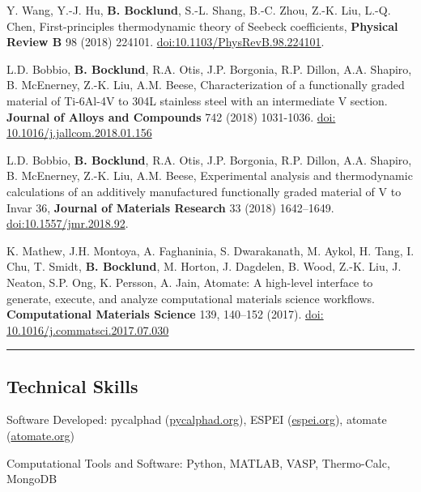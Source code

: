 \documentclass[10pt,letterpaper]{article}
\newenvironment{indentsection}[1]%
{\begin{list}{}%
  {\setlength{\leftmargin}{#1}}%
  \item[]%
}
{\end{list}}
\begin{document}
\begin{itemize*}
\item Y. Wang, Y.-J. Hu, \textbf{B. Bocklund}, S.-L. Shang, B.-C. Zhou, Z.-K. Liu, L.-Q. Chen,
  First-principles thermodynamic theory of Seebeck coefficients,
  \textbf{Physical Review B} 98 (2018) 224101.
  \href{https://doi.org/10.1103/PhysRevB.98.224101}{doi:10.1103/PhysRevB.98.224101}.

\item L.D. Bobbio, \textbf{B. Bocklund}, R.A. Otis, J.P. Borgonia, R.P. Dillon, A.A. Shapiro, B. McEnerney, Z.-K. Liu, A.M. Beese,
  Characterization of a functionally graded material of Ti-6Al-4V to 304L stainless steel with an intermediate V section. \textbf{Journal of Alloys and Compounds} 742 (2018) 1031-1036.
  \href{https://doi.org/10.1016/j.jallcom.2018.01.156}{doi: 10.1016/j.jallcom.2018.01.156}

\item L.D. Bobbio, \textbf{B. Bocklund}, R.A. Otis, J.P. Borgonia, R.P. Dillon, A.A. Shapiro, B. McEnerney, Z.-K. Liu, A.M. Beese,
  Experimental analysis and thermodynamic calculations of an additively manufactured functionally graded material of V to Invar 36,
  \textbf{Journal of Materials Research} 33 (2018) 1642–1649.
  \href{https://doi.org/10.1016/10.1557/jmr.2018.92}{doi:10.1557/jmr.2018.92}.

\item K. Mathew, J.H. Montoya, A. Faghaninia, S. Dwarakanath, M. Aykol,
  H. Tang, I. Chu, T. Smidt, \textbf{B. Bocklund}, M. Horton, J. Dagdelen, B. Wood, Z.-K. Liu, J. Neaton, S.P. Ong, K. Persson, A. Jain,
 Atomate: A high-level interface to generate, execute,
  and analyze computational materials science workflows. \textbf{Computational Materials Science} 139, 140–152 (2017).
  \href{https://doi.org/10.1016/j.commatsci.2017.07.030}{doi: 10.1016/j.commatsci.2017.07.030}

\end{itemize*}

\hrule
\vspace{-0.6em}
\subsection*{Technical Skills}

\begin{indentsection}{\parindent}
\begin{description*}
  \item [Software Developed:]
  pycalphad (\href{https://pycalphad.org}{pycalphad.org}),
  ESPEI (\href{https://espei.org}{espei.org}),
  atomate (\href{https://atomate.org}{atomate.org})
  \item[Computational Tools and Software:]
  Python, MATLAB, VASP, Thermo-Calc, MongoDB
\end{description*}
\end{indentsection}
\end{document}

